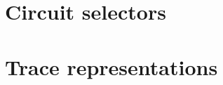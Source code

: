 \section{Circuit selectors}                                                 \label{bls: circuit selectors}                                       
     
\newpage     
\section{Trace representations}                                             \label{bls: trace representations}                                   